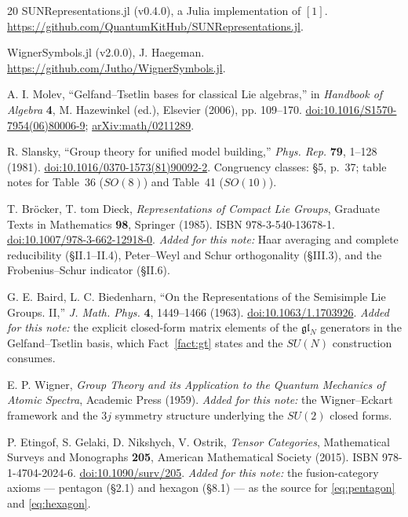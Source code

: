 \documentclass[11pt,a4paper]{article}
\theoremstyle{plain}
\theoremstyle{definition}
\newcommand{\g}{\mathfrak{g}}
\begin{document}
\begin{thebibliography}{20}
 SUNRepresentations.jl (v0.4.0), a Julia implementation of
$[1]$. \url{https://github.com/QuantumKitHub/SUNRepresentations.jl}.

 WignerSymbols.jl (v2.0.0), J. Haegeman.
\url{https://github.com/Jutho/WignerSymbols.jl}.

 A. I. Molev, ``Gelfand--Tsetlin bases for classical Lie
algebras,'' in \emph{Handbook of Algebra} \textbf{4}, M. Hazewinkel (ed.),
Elsevier (2006), pp. 109--170.
\href{https://doi.org/10.1016/S1570-7954(06)80006-9}{doi:10.1016/S1570-7954(06)80006-9};
\href{https://arxiv.org/abs/math/0211289}{arXiv:math/0211289}.

 R. Slansky, ``Group theory for unified model building,''
\emph{Phys. Rep.} \textbf{79}, 1--128 (1981).
\href{https://doi.org/10.1016/0370-1573(81)90092-2}{doi:10.1016/0370-1573(81)90092-2}.
Congruency classes: \S5, p.~37; table notes for Table~36 ($SO(8)$) and
Table~41 ($SO(10)$).

 T. Br\"ocker, T. tom Dieck,
\emph{Representations of Compact Lie Groups},
Graduate Texts in Mathematics \textbf{98}, Springer (1985).
ISBN 978-3-540-13678-1.
\href{https://doi.org/10.1007/978-3-662-12918-0}{doi:10.1007/978-3-662-12918-0}.
\emph{Added for this note:} Haar averaging and complete reducibility
(\S II.1--II.4), Peter--Weyl and Schur orthogonality (\S III.3), and the
Frobenius--Schur indicator (\S II.6).

 G. E. Baird, L. C. Biedenharn,
``On the Representations of the Semisimple Lie Groups. II,''
\emph{J. Math. Phys.} \textbf{4}, 1449--1466 (1963).
\href{https://doi.org/10.1063/1.1703926}{doi:10.1063/1.1703926}.
\emph{Added for this note:} the explicit closed-form matrix elements of the
$\g\mathfrak{l}_N$ generators in the Gelfand--Tsetlin basis, which
Fact~\ref{fact:gt} states and the $SU(N)$ construction consumes.

 E. P. Wigner,
\emph{Group Theory and its Application to the Quantum Mechanics of Atomic
Spectra}, Academic Press (1959).
\emph{Added for this note:} the Wigner--Eckart framework and the $3j$ symmetry
structure underlying the $SU(2)$ closed forms.

 P. Etingof, S. Gelaki, D. Nikshych, V. Ostrik,
\emph{Tensor Categories}, Mathematical Surveys and Monographs \textbf{205},
American Mathematical Society (2015). ISBN 978-1-4704-2024-6.
\href{https://doi.org/10.1090/surv/205}{doi:10.1090/surv/205}.
\emph{Added for this note:} the fusion-category axioms --- pentagon (\S2.1) and
hexagon (\S8.1) --- as the source for
\eqref{eq:pentagon} and \eqref{eq:hexagon}.


\end{thebibliography}
\end{document}
